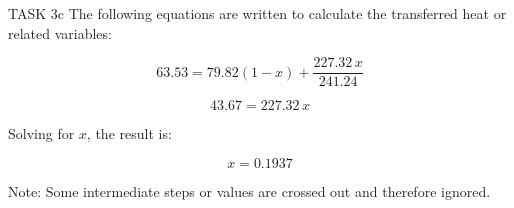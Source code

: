 TASK 3c  
The following equations are written to calculate the transferred heat or related variables:

\[
63.53 = 79.82 \left(1 - x\right) + \frac{227.32 \, x}{241.24}
\]

\[
43.67 = 227.32 \, x
\]

Solving for \( x \), the result is:

\[
x = 0.1937
\]  

Note: Some intermediate steps or values are crossed out and therefore ignored.